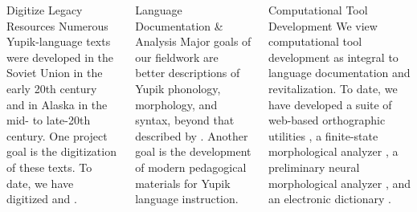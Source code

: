 \documentclass[usenames,dvipsnames]{beamer}
\begin{document}
\begin{frame}[fragile]
\begin{columns}
\begin{column}{0.29\textwidth}
\begin{block}{Digitize Legacy Resources}
Numerous Yupik-language texts were developed in the Soviet Union in the early 20th century and in Alaska in the mid- to late-20th century.
%
One project goal is the digitization of these texts.
%
To date, we have digitized \citet{Apassingok:LoreSLI, Apassingok:Readers} and \citet{Koonooka:2003}.
%

\end{block}
\end{column}

\begin{column}{0.29\textwidth}
\begin{block}{Language Documentation \& Analysis}
%
Major goals of our fieldwork are better descriptions of Yupik phonology, morphology, and syntax, beyond that described by \citet{Jacobson:2001}.
%
Another goal is the development of modern pedagogical materials for Yupik language instruction.

\end{block}
\end{column}

\begin{column}{0.29\textwidth}
\begin{block}{Computational Tool Development}
%
We view computational tool development as integral to language documentation and revitalization.
%
%
To date, we have developed a suite of web-based orthographic utilities \citep{SchwartzChen:2017}, a finite-state morphological analyzer \citep{ChenSchwartz:LREC:2018}, a preliminary neural morphological analyzer \citep{Schwartz:etal:ComputEL:2019}, and an electronic  dictionary \citep{Hunt:etal:ICLDC:2019}.
%
\end{block}
\end{column}
\end{columns}

\end{frame}
\end{document}
